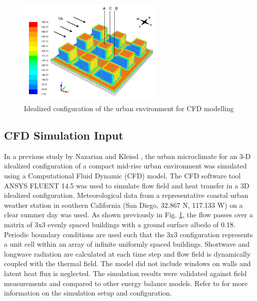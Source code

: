 \documentclass[preprint,3p,12pt,english]{elsarticle}
\begin{document}
\begin {figure}[h]
\graphicspath{ {image/} }
\includegraphics[width=7cm]{ThermalEnvironmentModel.PNG}
\centering
\caption{Idealized configuration of the urban environment for CFD modelling \cite{nazarian2014effects}}
\label{Fig.IdealUrban}
\end {figure}


\subsection{CFD Simulation Input}
In a previous study by Nazarian and Kleissl \cite{nazarian2014effects, nazarian2015cfd}, the urban microclimate for an 3-D idealized configuration of a compact mid-rise urban environment was simulated using a Computational Fluid Dynamic (CFD) model. The CFD software tool ANSYS FLUENT 14.5 was used to simulate flow field and heat transfer in a 3D idealized configuration. Meteorological data from a representative coastal urban weather station in southern California (San Diego, 32.867 N, 117.133 W) on a clear summer day was used. As shown previously in Fig. \ref{Fig.IdealUrban}, the flow passes over a matrix of 3x3 evenly spaced buildings with a ground surface albedo of 0.18. Periodic boundary conditions are used such that the 3x3 configuration represents a unit cell within an array of infinite uniformly spaced buildings. Shortwave and longwave radiation are calculated at each time step and flow field is dynamically coupled with the thermal field. The model did not include windows on walls and latent heat flux is neglected. The simulation results were validated against field measurements and compared to other energy balance models. Refer to \cite{nazarian2014effects, nazarian2015cfd} for more information on the simulation setup and configuration.
\end{document}
